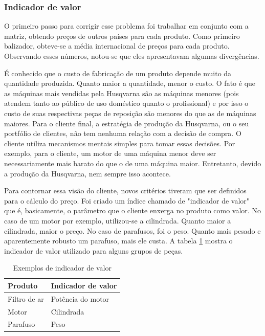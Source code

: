 \documentclass[12pt]{article}
\begin{document}
\subsubsection{Indicador de valor}

	O primeiro passo para corrigir esse problema foi trabalhar em conjunto com a matriz, obtendo preços de outros países para cada produto. Como primeiro balizador, obteve-se a média internacional de preços para cada produto. Observando esses números, notou-se que eles apresentavam algumas divergências.

	É conhecido que o custo de fabricação de um produto depende muito da quantidade produzida. Quanto maior a quantidade, menor o custo. O fato é que as máquinas mais vendidas pela Husqvarna são as máquinas menores (pois atendem tanto ao público de uso doméstico quanto o profissional) e por isso o custo de suas respectivas peças de reposição são menores do que as de máquinas maiores. Para o cliente final, a estratégia de produção da Husqvarna, ou o seu portfólio de clientes, não tem nenhuma relação com a decisão de compra. O cliente utiliza mecanismos mentais simples para tomar essas decisões. Por exemplo, para o cliente, um motor de uma máquina menor deve ser necessariamente mais barato do que o de uma máquina maior. Entretanto, devido a produção da Husqvarna, nem sempre isso acontece.

	Para contornar essa visão do cliente, novos critérios tiveram que ser definidos para o cálculo do preço. Foi criado um índice chamado de "indicador de valor" que é, basicamente, o parâmetro que o cliente enxerga no produto como valor. No caso de um motor por exemplo, utilizou-se a cilindrada. Quanto maior a cilindrada, maior o preço. No caso de parafusos, foi o peso. Quanto mais pesado e aparentemente robusto um parafuso, mais ele custa. A tabela \ref{tab:valor} mostra o indicador de valor utilizado para alguns grupos de peças.

\begin{table}[!h]
	\centering
	\caption{Exemplos de indicador de valor}
	\begin{tabular}{| l | l |}
		\hline
		Produto & Indicador de valor \\ \hline
		Filtro de ar & Potência do motor \\
		Motor & Cilindrada \\
		Parafuso & Peso \\
		\hline
	\end{tabular}
	\label{tab:valor}
\end{table}
\end{document}
